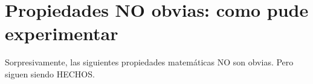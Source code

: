 \chapter{Propiedades NO obvias: como pude experimentar}

	Sorpresivamente, las siguientes propiedades matemáticas NO son obvias. Pero siguen siendo HECHOS.